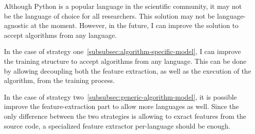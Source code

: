 Although Python is a popular language in the scientific community, it may not be the language of choice for all researchers.
This solution may not be language-agnostic at the moment.
However, in the future, I can improve the solution to accept algorithms from any language.

In the case of strategy one~\ref{subsubsec:algorithm-specific-model}, I can improve the training structure to accept algorithms from any language.
This can be done by allowing decoupling both the feature extraction, as well as the execution of the algorithm, from the training process.

In the case of strategy two~\ref{subsubsec:generic-algorithm-model}, it is possible improve the feature-extraction part to allow more languages as well.
Since the only difference between the two strategies is allowing to exract features from the source code, a specialized feature extractor per-language should be enough.


